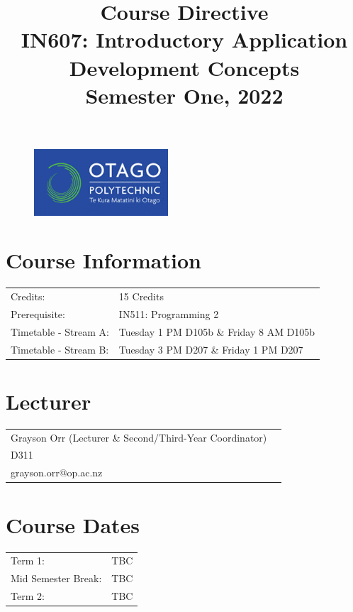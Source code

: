 \documentclass{article}
\author{}
\begin{document}
 

\begin{figure}
	\includegraphics[width=50mm]{../img/logo.png} 
\end{figure}

\title{Course Directive\\IN607: Introductory Application Development Concepts\\Semester One, 2022}
\date{}
\maketitle

\section*{Course Information}
\begin{tabular}{ll}
	Credits:            & 15 Credits                             \\
	Prerequisite:       & IN511: Programming 2                   \\
	Timetable - Stream A:  & Tuesday 1 PM D105b \& Friday 8 AM D105b  \\    
	Timetable - Stream B:  & Tuesday 3 PM D207 \& Friday 1 PM D207  \\   
\end{tabular} 

\section*{Lecturer}
\begin{tabular}{ll}
	Grayson Orr (Lecturer \& Second/Third-Year Coordinator) \\
	D311                   \\
	grayson.orr@op.ac.nz   \\
\end{tabular}

\section*{Course Dates}
\begin{tabular}{ll} 
	Term 1:             & TBC \\
	Mid Semester Break: & TBC    \\
	Term 2:             & TBC         
\end{tabular}
\end{document}

